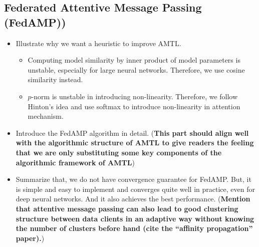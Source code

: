 {\subsection{Federated Attentive Message Passing (FedAMP))}

\begin{itemize}
    \item Illustrate why we want a heuristic to improve AMTL.
    \begin{itemize}
        \item Computing model similarity by inner product of model parameters is unstable, especially for large neural networks. Therefore, we use cosine similarity instead.
        \item $p$-norm is unstable in introducing non-linearity. Therefore, we follow Hinton's idea and use softmax to introduce non-linearity in attention mechanism.
    \end{itemize}
    
    \item Introduce the {FedAMP} algorithm in detail. (\textbf{This part should align well with the algorithmic structure of AMTL to give readers the feeling that we are only substituting some key components of the algorithmic framework of AMTL})
    
    \item Summarize that, we do not have convergence guarantee for {FedAMP}. But, it is simple and easy to implement and converges quite well in practice, even for deep neural networks. And it also achieves the best performance. (\textbf{Mention that attentive message passing can also lead to good clustering structure between data clients in an adaptive way without knowing the number of clusters before hand (cite the ``affinity propagation'' paper).})
\end{itemize}

}
